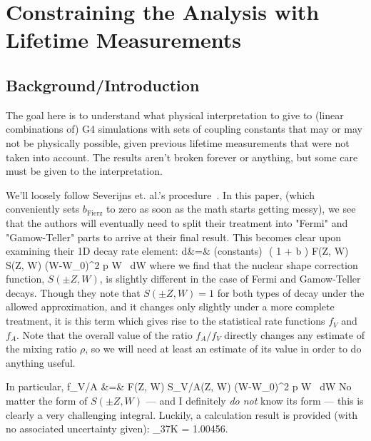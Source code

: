 


\chapter[How To Lifetime]{Constraining the Analysis with Lifetime Measurements}
\section[Intro]{Background/Introduction}

The goal here is to understand what physical interpretation to give to (linear combinations of) G4 simulations with sets of coupling constants that may or may not be physically possible, given previous lifetime measurements that were not taken into account.  The results aren't broken forever or anything, but some care must be given to the interpretation.  

We'll loosely follow Severijns et. al.'s procedure~\cite{SeverijnsTandecki2008}.  In this paper, (which conveniently sets $b_{\mathrm{Fierz}}$ to zero as soon as the math starts getting messy), we see that the authors will eventually need to split their treatment into "Fermi" and "Gamow-Teller" parts to arrive at their final result.  This becomes clear upon examining their 1D decay rate element:
\bea
d\Gamma &=& (\textrm{constants})\,\, \xi \left( 1 +  b \right) F(\pm Z, W) S(\pm Z, W) (W-W_0)^2 p W \, dW
\eea
where we find that the nuclear shape correction function, $S(\pm Z, W)$, is slightly different in the case of Fermi and Gamow-Teller decays.  Though they note that $S(\pm Z, W)=1$ for both types of decay under the allowed approximation, and it changes only slightly under a more complete treatment, it is this term which gives rise to the statistical rate functions $f_V$ and $f_A$.  Note that the overall value of the ratio $f_A/f_V$ directly changes any estimate of the mixing ratio $\rho$, so we will need at least an estimate of its value in order to do anything useful.  

In particular, 
\bea
f_{V/A} &=& \int F(\pm Z, W) S_{V/A}(\pm Z, W) (W-W_0)^2 p W \, dW
\eea
No matter the form of $S(\pm Z, W)$ --- and I definitely \emph{do not} know its form --- this is clearly a very challenging integral.  Luckily, a calculation result is provided (with no associated uncertainty given): 
\bea
{}  \biggm\lvert _{37K} = 1.00456.
\eea

